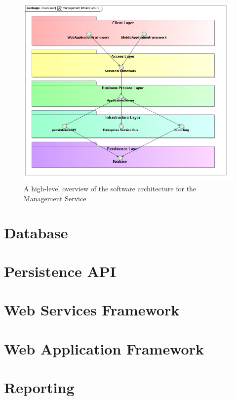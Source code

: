 \begin{figure}[H]
  \begin{center}
  \includegraphics[scale=0.4]{../Diagrams and Charts/Overview/ManagementInfrastructure.jpg}
  \caption{A high-level overview of the software architecture for the Management Service}
  \label{fig:managementInfrastructure}
  \end{center}
\end{figure}

\section{Database}


\section{Persistence API}


\section{Web Services Framework}


\section{Web Application Framework}


\section{Reporting}

